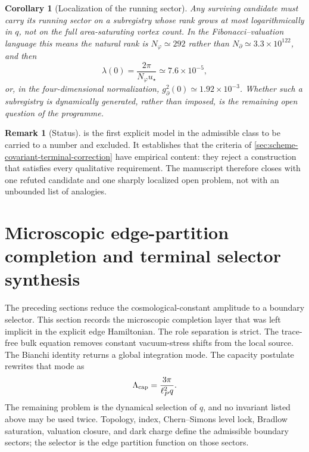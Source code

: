 \documentclass[aps,prd,reprint,nofootinbib,superscriptaddress,floatfix]{revtex4-2}
\numberwithin{equation}{section}
\theoremstyle{definition}
\newtheorem{remark}{Remark}[section]
\theoremstyle{plain}
\newtheorem{corollary}{Corollary}[section]
\begin{document}
\begin{corollary}[Localization of the running sector]
\label{cor:running-sector-localization}
Any surviving candidate must carry its running sector on a subregistry whose
rank grows at most logarithmically in \(q\), not on the full area-saturating
vortex count.  In the Fibonacci--valuation language this means the natural
rank is \(N_\varphi\simeq292\) rather than \(N_\partial\simeq3.3\times10^{122}\),
and then
\begin{equation}
\lambda(0)=\frac{2\pi}{N_\varphi u_\star}\simeq7.6\times10^{-5},
\end{equation}
or, in the four-dimensional normalization,
\(g_\partial^2(0)\simeq1.92\times10^{-3}\).  Whether such a subregistry is
dynamically generated, rather than imposed, is the remaining open question of
the programme.
\end{corollary}

\begin{remark}[Status]
 is the first explicit model in the admissible
class to be carried to a number and excluded.  It establishes that the
criteria of \cref{sec:scheme-covariant-terminal-correction} have empirical
content: they reject a construction that satisfies every qualitative
requirement.  The manuscript therefore closes with one refuted candidate and
one sharply localized open problem, not with an unbounded list of analogies.
\end{remark}



\section{Microscopic edge-partition completion and terminal selector synthesis}
\label{sec:edge-partition-completion}

The preceding sections reduce the cosmological-constant amplitude to a boundary
selector.  This section records the microscopic completion layer that was left
implicit in the explicit edge Hamiltonian.  The role separation is strict.  The
trace-free bulk equation removes constant vacuum-stress shifts from the local
source.  The Bianchi identity returns a global integration mode.  The capacity
postulate rewrites that mode as
\[
\Lambda_{\rm cap}=\frac{3\pi}{\ell_P^2 q}.
\]
The remaining problem is the dynamical selection of \(q\), and no invariant
listed above may be used twice.  Topology, index, Chern--Simons level lock,
Bradlow saturation, valuation closure, and dark charge define the admissible
boundary sectors; the selector is the edge partition function on those sectors.
\end{document}
